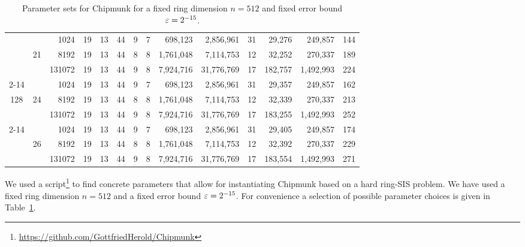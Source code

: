 \begin{table*}
\begin{tabular}{ccr|cc|cccrr|crr|c}
      &       &   1024 &         19 &        13 &        44 &          9 &       7 &        698,123 &  2,856,961 &    31 &       29,276 &   249,857 & 144 \\%
      &    21 &   8192 &         19 &        13 &       44 &          8 &       8 &      1,761,048 &  7,114,753 &    12 &       32,252 &   270,337 & 189 \\%
      &       & 131072 &         19 &        13 &       44 &          9 &       8 &      7,924,716 & 31,776,769 &    17 &      182,757 & 1,492,993 & 224 \\\cline{2-14}
  
      &       &   1024 &         19 &        13 &       44 &          9 &       7 &        698,123 &  2,856,961 &    31 &       29,357 &   249,857 & 162 \\%
  128 &    24 &   8192 &         19 &        13 &       44 &          8 &       8 &      1,761,048 &  7,114,753 &    12 &       32,339 &   270,337 & 213 \\%
      &       & 131072 &         19 &        13 &       44 &          9 &       8 &      7,924,716 & 31,776,769 &    17 &      183,255 & 1,492,993 & 252 \\\cline{2-14}
  
      &       &   1024 &         19 &        13 &       44 &          9 &       7 &        698,123 &  2,856,961 &    31 &       29,405 &   249,857 & 174 \\%
      &    26 &   8192 &         19 &        13 &       44 &          8 &       8 &      1,761,048 &  7,114,753 &    12 &       32,392 &   270,337 & 229 \\%
      &       & 131072 &         19 &        13 &       44 &          9 &       8 &      7,924,716 & 31,776,769 &    17 &      183,554 & 1,492,993 & 271 \\\bottomrule
    \end{tabular}
    \caption{Parameter sets for Chipmunk for a fixed ring dimension $n=512$ and fixed error bound $\varepsilon=2^{-15}$.}\label{tab:param}
  \end{table*}
\egroup

We used a script\footnote{
\url{https://github.com/GottfriedHerold/Chipmunk}%
}
to find concrete parameters that allow for instantiating Chipmunk based on a hard ring-SIS problem.
We have used a fixed ring dimension $n = 512$ and a fixed error bound $\varepsilon=2^{-15}$.
For convenience a selection of possible parameter choices is given in Table~\ref{tab:param}.
